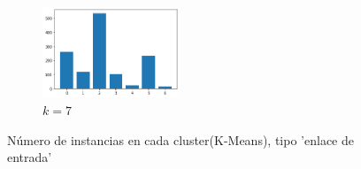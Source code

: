 \begin{figure}[H]
\begin{subfigure}{.5\textwidth}
\end{subfigure}
\begin{subfigure}{.5\textwidth}
  \centering
  \includegraphics[width=0.45\textwidth]{imagenes/counter/entrada/km7.png}
  \caption{$k=7$}
\end{subfigure}
\caption{Número de instancias en cada cluster(K-Means), tipo 'enlace de entrada'}
\label{fig:hm-km}
\end{figure}

